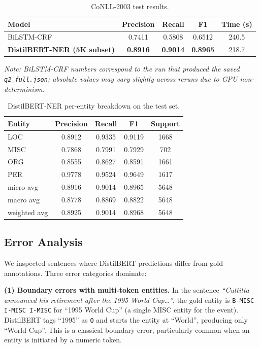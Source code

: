 \documentclass[11pt,a4paper]{article}
\begin{document}
\begin{table}[h!]
\centering
\small
\caption{CoNLL-2003 test results.}
\begin{tabular}{lcccc}
\toprule
\textbf{Model} & \textbf{Precision} & \textbf{Recall} & \textbf{F1} & \textbf{Time (s)}\\
\midrule
BiLSTM-CRF & 0.7411 & 0.5808 & 0.6512 & 240.5\\
\textbf{DistilBERT-NER (5K subset)} & \textbf{0.8916} & \textbf{0.9014} & \textbf{0.8965} & 218.7\\
\bottomrule
\end{tabular}
\end{table}

\textit{Note: BiLSTM-CRF numbers correspond to the run that produced the saved \texttt{q2\_full.json}; absolute values may vary slightly across reruns due to GPU non-determinism.}

\begin{table}[h!]
\centering
\small
\caption{DistilBERT-NER per-entity breakdown on the test set.}
\begin{tabular}{lcccc}
\toprule
\textbf{Entity} & \textbf{Precision} & \textbf{Recall} & \textbf{F1} & \textbf{Support}\\
\midrule
LOC  & 0.8912 & 0.9335 & 0.9119 & 1668\\
MISC & 0.7868 & 0.7991 & 0.7929 &  702\\
ORG  & 0.8555 & 0.8627 & 0.8591 & 1661\\
PER  & 0.9778 & 0.9524 & 0.9649 & 1617\\
\midrule
micro avg     & 0.8916 & 0.9014 & 0.8965 & 5648\\
macro avg     & 0.8778 & 0.8869 & 0.8822 & 5648\\
weighted avg  & 0.8925 & 0.9014 & 0.8968 & 5648\\
\bottomrule
\end{tabular}
\end{table}

\subsection{Error Analysis}

We inspected sentences where DistilBERT predictions differ from gold annotations. Three error categories dominate:

\textbf{(1) Boundary errors with multi-token entities.} In the sentence
\textit{``Cuttitta announced his retirement after the 1995 World Cup\dots''},
the gold entity is \texttt{B-MISC I-MISC I-MISC} for ``1995 World Cup'' (a single MISC entity for the event). DistilBERT tags ``1995'' as \texttt{O} and starts the entity at ``World'', producing only ``World Cup''. This is a classical boundary error, particularly common when an entity is initiated by a numeric token.
\end{document}
